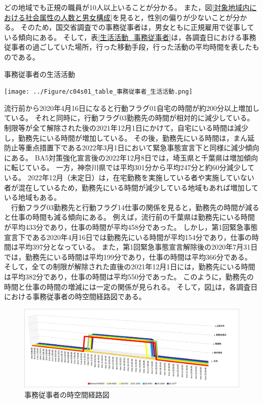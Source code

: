 \documentclass[paper={210mm,297mm},line_length=35zw,number_of_lines=31,head_space=30mm,gutter=40mm,baselineskip=2.0zw,headfoot_verticalposition=1.5zw]{jlreq}
\begin{document}
どの地域でも正規の職員が10人以上いることが分かる。
また，図\ref{対象地域内における社会属性の人数と男女構成}を見ると，性別の偏りが少ないことが分かる。
そのため，国交省調査での事務従事者は，男女ともに正規雇用で従事している傾向にある。
そして，表\ref{生活活動_事務従事者}は，各調査日における事務従事者の過ごしていた場所，行った移動手段，行った活動の平均時間を表したものである。\\

\begin{table}[H]
  \centering
  \caption{事務従事者の生活活動}
  \texttt{[image: ../Figure/c04s01\_table\_事務従事者\_生活活動.png]}
  \label{生活活動_事務従事者}
\end{table}

流行前から2020年4月16日になると行動フラグ01自宅の時間が約200分以上増加している。
それと同時に，行動フラグ03勤務先の時間が相対的に減少している。
制限等が全て解除された後の2021年12月1日にかけて，自宅にいる時間は減少し，勤務先にいる時間が増加している。
その後，勤務先にいる時間は，まん延防止等重点措置下である2022年3月1日において緊急事態宣言下と同様に減少傾向にある。
BA5対策強化宣言後の2022年12月8日では，埼玉県と千葉県は増加傾向に転じている。
一方，神奈川県では平均301分から平均247分と約60分減少している。
2022年12月（未定日）は，在宅勤務を実施している者や実施していない者が混在しているため，勤務先にいる時間が減少している地域もあれば増加している地域もある。\\
　行動フラグ03勤務先と行動フラグ14仕事の関係を見ると，勤務先の時間が減ると仕事の時間も減る傾向にある。
例えば，流行前の千葉県は勤務先にいる時間が平均433分であり，仕事の時間が平均458分であった。
しかし，第1回緊急事態宣言下である2020年4月16日では勤務先にいる時間が平均154分であり，仕事の時間は平均397分となっている。
また，第1回緊急事態宣言解除後の2020年7月31日では，勤務先にいる時間は平均199分であり，仕事の時間は平均366分である。
そして，全ての制限が解除された直後の2021年12月1日には，勤務先にいる時間は平均382分であり，仕事の時間は平均550分であった。
このように，勤務先の時間と仕事の時間の増減には一定の関係が見られる。
そして，図\ref{時空間経路図_事務従事者}は，各調査日における事務従事者の時空間経路図である。\\

\begin{figure}[H]
  \centering
  \includegraphics[scale=0.4]{../Figure/c04s01_fig_事務従事者_時空間経路図.png}
  \caption{事務従事者の時空間経路図}
  \label{時空間経路図_事務従事者}
\end{figure}
\end{document}
